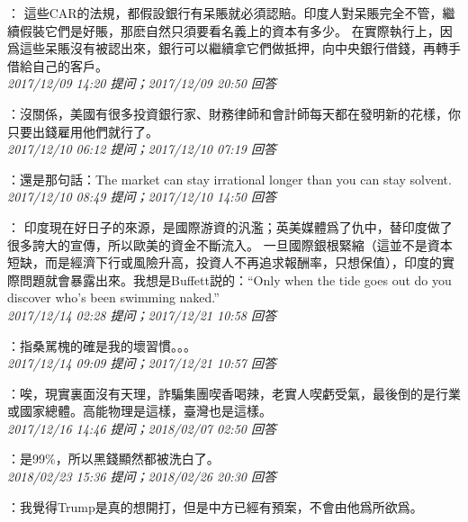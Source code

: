 \documentclass[twocolumn]{ctexart}
\begin{document}
：
這些CAR的法規，都假設銀行有呆賬就必須認賠。印度人對呆賬完全不管，繼續假裝它們是好賬，那麽自然只須要看名義上的資本有多少。
在實際執行上，因爲這些呆賬沒有被認出來，銀行可以繼續拿它們做抵押，向中央銀行借錢，再轉手借給自己的客戶。
\\

\textit{\hfill\noindent\small 2017/12/09 14:20 提问；2017/12/09 20:50 回答}

：沒關係，美國有很多投資銀行家、財務律師和會計師每天都在發明新的花樣，你只要出錢雇用他們就行了。
\\

\textit{\hfill\noindent\small 2017/12/10 06:12 提问；2017/12/10 07:19 回答}

：還是那句話：The market can stay irrational longer than you can stay solvent.
\\

\textit{\hfill\noindent\small 2017/12/10 08:49 提问；2017/12/10 14:50 回答}

：
印度現在好日子的來源，是國際游資的汎濫；英美媒體爲了仇中，替印度做了很多誇大的宣傳，所以歐美的資金不斷流入。
一旦國際銀根緊縮（這並不是資本短缺，而是經濟下行或風險升高，投資人不再追求報酬率，只想保值），印度的實際問題就會暴露出來。我想是Buffett説的：“Only when the tide goes out do you discover who's been swimming naked.”
\\

\textit{\hfill\noindent\small 2017/12/14 02:28 提问；2017/12/21 10:58 回答}

：指桑駡槐的確是我的壞習慣。。。
\\

\textit{\hfill\noindent\small 2017/12/14 09:09 提问；2017/12/21 10:57 回答}

：唉，現實裏面沒有天理，詐騙集團喫香喝辣，老實人喫虧受氣，最後倒的是行業或國家總體。高能物理是這樣，臺灣也是這樣。
\\

\textit{\hfill\noindent\small 2017/12/16 14:46 提问；2018/02/07 02:50 回答}

：是99\%，所以黑錢顯然都被洗白了。
\\

\textit{\hfill\noindent\small 2018/02/23 15:36 提问；2018/02/26 20:30 回答}

：我覺得Trump是真的想開打，但是中方已經有預案，不會由他爲所欲爲。
\\
\end{document}
